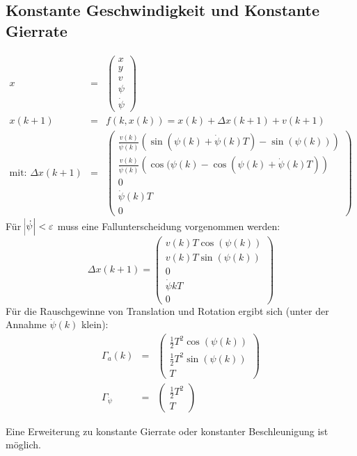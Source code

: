 \subsection{Konstante Geschwindigkeit und Konstante Gierrate}
\begin{eqnarray*}
    x &=&
        \begin{pmatrix}
            x \\ y \\ v \\ \psi \\ \dot{\psi}
        \end{pmatrix} \\
    x(k+1) &=& f(k, x(k)) = x(k) + \Delta x(k+1) + v(k+1) \\
    \text{mit: } \Delta x(k+1) &=& 
        \begin{pmatrix}
            \frac{v(k)}{\dot{\psi}(k)} \left(\sin(\psi(k) + \dot{\psi}(k) T) - \sin(\psi(k))\right) \\
            \frac{v(k)}{\dot{\psi}(k)} \left(\cos(\psi(k) - \cos(\psi(k) + \dot{\psi}(k) T) \right) \\
            0 \\
            \dot{\psi}(k) T \\
            0
        \end{pmatrix}
\end{eqnarray*}
Für $\abs{\dot{\psi}} < \varepsilon$ muss eine Fallunterscheidung vorgenommen werden:
\begin{equation*}
    \Delta x(k+1) = 
        \begin{pmatrix}
            v(k) T \cos(\psi(k)) \\
            v(k) T \sin(\psi(k)) \\
            0 \\
            \dot{\psi}{k} T \\
            0
        \end{pmatrix}
\end{equation*}
Für die Rauschgewinne von Translation und Rotation ergibt sich (unter der Annahme $\dot{\psi}(k)$ klein):
\begin{eqnarray*}
    \Gamma_a(k) &=&
        \begin{pmatrix}
            \frac{1}{2} T^2 \cos(\psi(k)) \\
            \frac{1}{2} T^2 \sin(\psi(k)) \\
            T
        \end{pmatrix} \\
    \Gamma_{\ddot{\psi}} &=& 
        \begin{pmatrix}
            \frac{1}{2} T^2 \\
            T
        \end{pmatrix}
\end{eqnarray*}

Eine Erweiterung zu konstante Gierrate oder konstanter Beschleunigung ist möglich.
